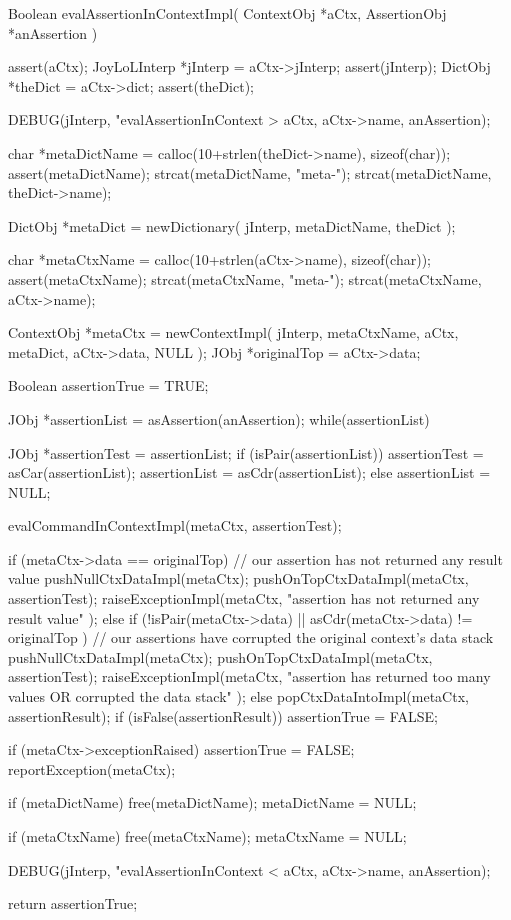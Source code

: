 \startCCode
Boolean evalAssertionInContextImpl(
  ContextObj   *aCtx,
  AssertionObj *anAssertion
) {
  assert(aCtx);
  JoyLoLInterp *jInterp = aCtx->jInterp;
  assert(jInterp);
  DictObj *theDict = aCtx->dict;
  assert(theDict);
  
  DEBUG(jInterp, "evalAssertionInContext > %
    aCtx, aCtx->name, anAssertion);

  char *metaDictName = calloc(10+strlen(theDict->name), sizeof(char));
  assert(metaDictName);
  strcat(metaDictName, "meta-");
  strcat(metaDictName, theDict->name);
  
  DictObj *metaDict = newDictionary(
    jInterp,
    metaDictName,
    theDict
  );
  
  char *metaCtxName = calloc(10+strlen(aCtx->name), sizeof(char));
  assert(metaCtxName);
  strcat(metaCtxName, "meta-");
  strcat(metaCtxName, aCtx->name);
  
  ContextObj *metaCtx = newContextImpl(
    jInterp,
    metaCtxName,
    aCtx,
    metaDict,
    aCtx->data,
    NULL
  );
  JObj *originalTop = aCtx->data;
  
  Boolean assertionTrue = TRUE;

  JObj *assertionList = asAssertion(anAssertion);
  while(assertionList) {
    JObj *assertionTest = assertionList;
    if (isPair(assertionList)) {
      assertionTest = asCar(assertionList);
      assertionList = asCdr(assertionList);
    } else {
      assertionList = NULL;
    }

    evalCommandInContextImpl(metaCtx, assertionTest);
    
    if (metaCtx->data == originalTop) {
      // our assertion has not returned any result value
      pushNullCtxDataImpl(metaCtx);
      pushOnTopCtxDataImpl(metaCtx, assertionTest);
      raiseExceptionImpl(metaCtx,
        "assertion has not returned any result value"
        );
    } else if (!isPair(metaCtx->data) 
      || asCdr(metaCtx->data) != originalTop ) {
      // our assertions have corrupted the original context's data stack
      pushNullCtxDataImpl(metaCtx);
      pushOnTopCtxDataImpl(metaCtx, assertionTest);
      raiseExceptionImpl(metaCtx,
        "assertion has returned too many values OR corrupted the data stack"
        );
    } else {
      popCtxDataIntoImpl(metaCtx, assertionResult);
      if (isFalse(assertionResult)) {
        assertionTrue = FALSE;
      }
    }
  }
  
  if (metaCtx->exceptionRaised) {
    assertionTrue = FALSE;
    reportException(metaCtx);
  }
  
  if (metaDictName) free(metaDictName);
  metaDictName = NULL;
  
  if (metaCtxName) free(metaCtxName);
  metaCtxName = NULL;
  
  DEBUG(jInterp, "evalAssertionInContext < %
    aCtx, aCtx->name, anAssertion);
    
  return assertionTrue;
}
\stopCCode

